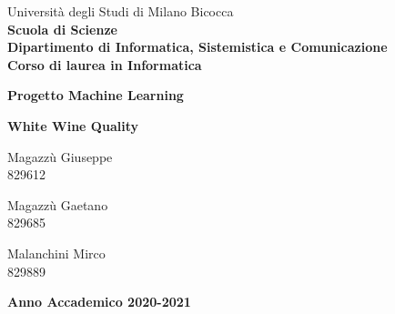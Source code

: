 \begin{titlepage}

\begingroup
\noindent
\begin{minipage}[t]{0.18\textwidth}
\end{minipage}%
\hfill
\begin{minipage}[t]{0.82\textwidth}\raggedright
  Università degli Studi di Milano Bicocca \\
  \small\textbf{Scuola di Scienze} \\
  \small\textbf{Dipartimento di Informatica, Sistemistica e Comunicazione}\\
  \small\textbf{Corso di laurea in Informatica} \\
\end{minipage}%
\par\endgroup

\vspace{35mm}

\begin{center}
  {\huge{\textbf{Progetto Machine Learning}}}

  \vspace{8mm}

  {\Huge{\textbf{White Wine Quality}}}
\end{center}

\vspace{25mm}

\begin{center}
  \large{Magazzù Giuseppe} \\ \large{829612}

  \vspace{4mm}
  \large{Magazzù Gaetano} \\ \large{829685}

  \vspace{4mm}
  \large{Malanchini Mirco} \\ \large{829889}
\end{center}

\vspace{30mm}
\begin{center}
  {\large{\bf Anno Accademico 2020-2021}}
\end{center}

\restoregeometry

\end{titlepage}
